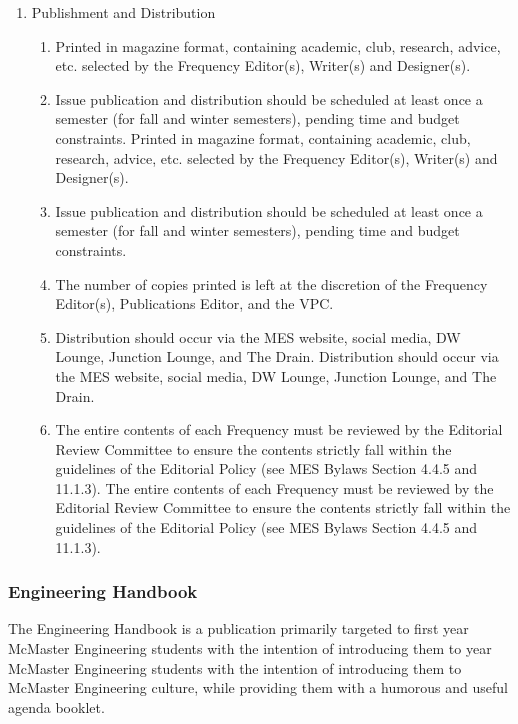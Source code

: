 \begin{enumerate}
 \item
  Publishment and Distribution

  \begin{enumerate}
   \item
    Printed in magazine format, containing academic, club, research, advice, etc. selected by the Frequency Editor(s), Writer(s) and Designer(s). 
   \item     
    Issue publication and distribution should be scheduled at least once a semester (for fall and winter semesters), pending time and budget constraints. 
    Printed in magazine format, containing academic, club, research, advice, etc. selected by the Frequency Editor(s), Writer(s) and Designer(s). 
   \item     
    Issue publication and distribution should be scheduled at least once a semester (for fall and winter semesters), pending time and budget constraints. 
   \item
    The number of copies printed is left at the discretion of the Frequency Editor(s), Publications Editor, and the VPC.
   \item
    Distribution should occur via the MES website, social media, DW Lounge, Junction Lounge, and The Drain.
    Distribution should occur via the MES website, social media, DW Lounge, Junction Lounge, and The Drain.
   \item
    The entire contents of each Frequency must be reviewed by the Editorial Review Committee to ensure the contents strictly fall within the guidelines of the Editorial Policy (see MES Bylaws Section 4.4.5 and 11.1.3). 
    The entire contents of each Frequency must be reviewed by the Editorial Review Committee to ensure the contents strictly fall within the guidelines of the Editorial Policy (see MES Bylaws Section 4.4.5 and 11.1.3). 

  \end{enumerate}
\end{enumerate}

\subsubsection{Engineering Handbook}
\label{engineering-handbook}
The Engineering Handbook is a publication primarily targeted to first
year McMaster Engineering students with the intention of introducing them to
year McMaster Engineering students with the intention of introducing them to
McMaster Engineering culture, while providing them with a humorous and
useful agenda booklet.

